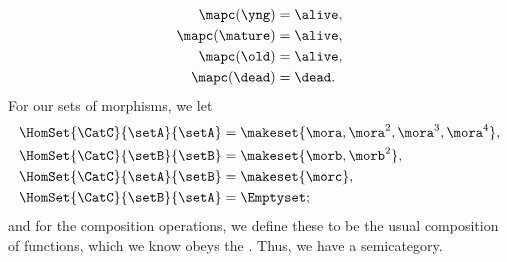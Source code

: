 \begin{example}
\begin{equation}
\begin{aligned}
            \mapc(\yng)    & =  \alive, \\
            \mapc(\mature) & = \alive, \\
            \mapc( \old)   & = \alive, \\
            \mapc (\dead)  & = \dead.
        \end{aligned}
    \end{equation}
    For our sets of morphisms, we let
    \begin{equation}
        \begin{aligned}
            \HomSet{\CatC}{\setA}{\setA} & = \makeset{ \mora, \mora^2, \mora^3, \mora^4 }, \\
            \HomSet{\CatC}{\setB}{\setB} & =  \makeset{ \morb, \morb^2 }, \\
            \HomSet{\CatC}{\setA}{\setB} & =  \makeset{ \morc }, \\
            \HomSet{\CatC}{\setB}{\setA} & = \Emptyset;
        \end{aligned}
    \end{equation}
    and for the composition operations, we define these to be the usual composition of functions, which we know obeys the .
    Thus, we have a semicategory.
\end{example}




%
%

